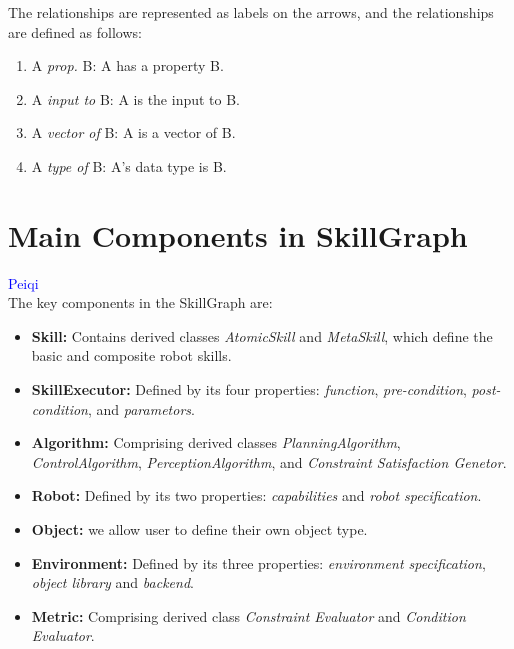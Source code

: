 \documentclass{article}
\newcommand{\assignee}[1]{\textcolor{blue}{#1}}
\begin{document}
The relationships are represented as labels on the arrows, and the relationships are defined as follows:
\begin{enumerate}
    \item A \textit{prop.} B: A has a property B. 
    \item A \textit{input to} B: A is the input to B. 
    \item A \textit{vector of} B: A is a vector of B.
    \item A \textit{type of} B: A's data type is B.
\end{enumerate}


\section{Main Components in SkillGraph}
\assignee{Peiqi}\\
The key components in the SkillGraph are:

\begin{itemize}
    \item \textbf{Skill:} Contains derived classes \textit{AtomicSkill} and \textit{MetaSkill}, which define the basic and composite robot skills.

    \item \textbf{SkillExecutor:} Defined by its four properties: \textit{function}, \textit{pre-condition}, \textit{post-condition}, and \textit{parametors}.
    
    \item \textbf{Algorithm:} Comprising derived classes \textit{PlanningAlgorithm}, \textit{ControlAlgorithm}, \textit{PerceptionAlgorithm}, and \textit{Constraint Satisfaction Genetor}.
    
    \item \textbf{Robot:} Defined by its two properties: \textit{capabilities} and \textit{robot specification}.

    \item \textbf{Object:} we allow user to define their own object type.
    
    \item \textbf{Environment:} Defined by its three properties: \textit{environment specification}, \textit{object library} and \textit{backend}.
    
    \item \textbf{Metric:} Comprising derived class \textit{Constraint Evaluator} and \textit{Condition Evaluator}.
\end{itemize}
\end{document}

